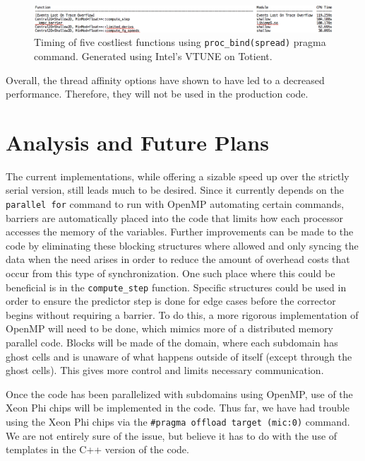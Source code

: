 \documentclass[12pt]{article}
\begin{document}
		\begin{figure}[h]
			\begin{center}
				\includegraphics[width=0.8\columnwidth]{bindspread}
				\caption{Timing of five costliest functions using \texttt{proc\_bind(spread)} pragma command. Generated using Intel's VTUNE on Totient.}
				\label{bindspread}
			\end{center}
		\end{figure}
		
		\noindent Overall, the thread affinity options have shown to have led to a decreased performance. Therefore, they will not be used in the production code.
		
\section{Analysis and Future Plans}
The current implementations, while offering a sizable speed up over the strictly serial version, still leads much to be desired. Since it currently depends on the \texttt{parallel for} command to run with OpenMP automating certain commands, barriers are automatically placed into the code that limits how each processor accesses the memory of the variables. Further improvements can be made to the code by eliminating these blocking structures where allowed and only syncing the data when the need arises in order to reduce the amount of overhead costs that occur from this type of synchronization. One such place where this could be beneficial is in the \texttt{compute\_step} function. Specific structures could be used in order to ensure the predictor step is done for edge cases before the corrector begins without requiring a barrier. To do this, a more rigorous implementation of OpenMP will need to be done, which mimics more of a distributed memory parallel code. Blocks will be made of the domain, where each subdomain has ghost cells and is unaware of what happens outside of itself (except through the ghost cells). This gives more control and limits necessary communication.

Once the code has been parallelized with subdomains using OpenMP, use of the Xeon Phi chips will be implemented in the code. Thus far, we have had trouble using the Xeon Phi chips via the \texttt{\#pragma offload target (mic:0)} command. We are not entirely sure of the issue, but believe it has to do with the use of templates in the C++ version of the code.
\end{document}
